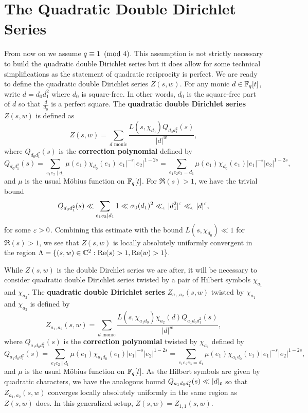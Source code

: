 \documentclass[12pt,reqno,oneside]{amsart}
\begin{document}
\section{The Quadratic Double Dirichlet Series}
    From now on we assume $q \equiv 1 \ \left(\text{mod }4\right)$. This assumption is not strictly necessary to build the quadratic double Dirichlet series but it does allow for some technical simplifications as the statement of quadratic reciprocity is perfect. We are ready to define the quadratic double Dirichlet series $Z(s,w)$. For any monic $d \in \mathbb{F}_{q}[t]$, write $d = d_{0}d_{1}^{2}$ where $d_{0}$ is square-free. In other words, $d_{0}$ is the square-free part of $d$ so that $\frac{d}{d_{0}}$ is a perfect square. The \textbf{quadratic double Dirichlet series} $Z(s,w)$ is defined as
    \[
        Z(s,w) = \sum_{\text{$d$ monic}}\frac{L(s,\chi_{d_{0}})Q_{d_{0}d_{1}^{2}}(s)}{|d|^{w}},
    \]
    where $Q_{d_{0}d_{1}^{2}}(s)$ is the \textbf{correction polynomial} defined by
    \[
        Q_{d_{0}d_{1}^{2}}(s) = \sum_{e_{1}e_{2} \mid d_{1}}\mu(e_{1})\chi_{d_{0}}(e_{1})|e_{1}|^{-s}|e_{2}|^{1-2s} = \sum_{e_{1}e_{2}e_{3} = d_{1}}\mu(e_{1})\chi_{d_{0}}(e_{1})|e_{1}|^{-s}|e_{2}|^{1-2s},
    \]
    and $\mu$ is the usual M\"obius function on $\mathbb{F}_{q}[t]$. For $\Re(s) > 1$, we have the trivial bound
    \[
        Q_{d_{0}d_{1}^{2}}(s) \ll \sum_{e_{1}e_{2} \mid d_{1}}1 \ll \sigma_{0}(d_{1})^{2} \ll_{\varepsilon} |d_{1}^{2}|^{\varepsilon} \ll_{\varepsilon} |d|^{\varepsilon},
    \]
    for some $\varepsilon > 0$. Combining this estimate with the bound $L(s,\chi_{d_{0}}) \ll 1$ for $\Re(s) > 1$, we see that $Z(s,w)$ is locally absolutely uniformly convergent in the region $\Lambda = \{(s,w) \in \mathbb{C}^{2}:\mathrm{Re}(s) > 1, \mathrm{Re}(w) > 1\}$.

    While $Z(s,w)$ is the double Dirchlet series we are after, it will be necessary to consider quadratic double Dirichlet series twisted by a pair of Hilbert symbols $\chi_{a_{1}}$ and $\chi_{a_{2}}$. The \textbf{quadratic double Dirichlet series} $Z_{a_{1},a_{2}}(s,w)$ twisted by $\chi_{a_{1}}$ and $\chi_{a_{2}}$ is defined by
    \[
        Z_{a_{1},a_{2}}(s,w) = \sum_{\text{$d$ monic}}\frac{L(s,\chi_{a_{1}d_{0}})\chi_{a_{2}}(d)Q_{a_{1}d_{0}d_{1}^{2}}(s)}{|d|^{w}},
    \]
    where $Q_{a_{1}d_{0}d_{1}^{2}}(s)$ is the \textbf{correction polynomial} twisted by $\chi_{a_{1}}$ defined by
    \[
        Q_{a_{1}d_{0}d_{1}^{2}}(s) = \sum_{e_{1}e_{2} \mid d_{1}}\mu(e_{1})\chi_{a_{1}d_{0}}(e_{1})|e_{1}|^{-s}|e_{2}|^{1-2s} = \sum_{e_{1}e_{2}e_{3} = d_{1}}\mu(e_{1})\chi_{a_{1}d_{0}}(e_{1})|e_{1}|^{-s}|e_{2}|^{1-2s},
    \]
    and $\mu$ is the usual M\"obius function on $\mathbb{F}_{q}[t]$. As the Hilbert symbols are given by quadratic characters, we have the analogous bound $Q_{a_{1}d_{0}d_{1}^{2}}(s) \ll |d|_{\varepsilon}$ so that $Z_{a_{1},a_{2}}(s,w)$ converges locally absolutely uniformly in the same region as $Z(s,w)$ does. In this generalized setup, $Z(s,w) = Z_{1,1}(s,w)$.
\end{document}
